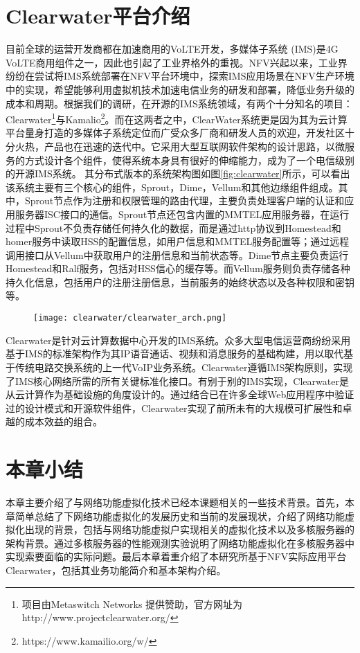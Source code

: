 \section{Clearwater平台介绍}
目前全球的运营开发商都在加速商用的VoLTE开发，多媒体子系统 (IMS)是4G VoLTE商用组件之一，因此也引起了工业界格外的重视。NFV兴起以来，工业界纷纷在尝试将IMS系统部署在NFV平台环境中，探索IMS应用场景在NFV生产环境中的实现，希望能够利用虚拟机技术加速电信业务的研发和部署，降低业务升级的成本和周期。根据我们的调研，在开源的IMS系统领域，有两个十分知名的项目：Clearwater\footnote{项目由Metaswitch Networks 提供赞助，官方网址为 http://www.projectclearwater.org/ }与Kamalio\footnote{https://www.kamailio.org/w/}。而在这两者之中，ClearWater系统更是因为其为云计算平台量身打造的多媒体子系统定位而广受众多厂商和研发人员的欢迎，开发社区十分火热，产品也在迅速的迭代中。它采用大型互联网软件架构的设计思路，以微服务的方式设计各个组件，使得系统本身具有很好的伸缩能力，成为了一个电信级别的开源IMS系统。
其分布式版本的系统架构图如图\ref{fig:clearwater}所示，可以看出该系统主要有三个核心的组件，Sprout，Dime，Vellum和其他边缘组件组成。其中，Sprout节点作为注册和权限管理的路由代理，主要负责处理客户端的认证和应用服务器ISC接口的通信。Sprout节点还包含内置的MMTEL应用服务器，在运行过程中Sprout不负责存储任何持久化的数据，而是通过http协议到Homestead和homer服务中读取HSS的配置信息，如用户信息和MMTEL服务配置等；通过远程调用接口从Vellum中获取用户的注册信息和当前状态等。Dime节点主要负责运行Homestead和Ralf服务，包括对HSS信心的缓存等。而Vellum服务则负责存储各种持久化信息，包括用户的注册注册信息，当前服务的始终状态以及各种权限和密钥等。
\begin{figure}[!htp]
	\centering
	\texttt{[image: clearwater/clearwater\_arch.png]}
\end{figure}
Clearwater是针对云计算数据中心开发的IMS系统。众多大型电信运营商纷纷采用基于IMS的标准架构作为其IP语音通话、视频和消息服务的基础构建，用以取代基于传统电路交换系统的上一代VoIP业务系统。Clearwater遵循IMS架构原则，实现了IMS核心网络所需的所有关键标准化接口。有别于别的IMS实现，Clearwater是从云计算作为基础设施的角度设计的。通过结合已在许多全球Web应用程序中验证过的设计模式和开源软件组件，Clearwater实现了前所未有的大规模可扩展性和卓越的成本效益的组合。

\section{本章小结}
本章主要介绍了与网络功能虚拟化技术已经本课题相关的一些技术背景。首先，本章简单总结了下网络功能虚拟化的发展历史和当前的发展现状，介绍了网络功能虚拟化出现的背景，包括与网络功能虚拟户实现相关的虚拟化技术以及多核服务器的架构背景。通过多核服务器的性能观测实验说明了网络功能虚拟化在多核服务器中实现索要面临的实际问题。最后本章着重介绍了本研究所基于NFV实际应用平台Clearwater，包括其业务功能简介和基本架构介绍。